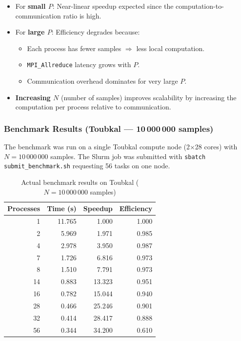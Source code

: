 \documentclass[11pt,a4paper]{article}
\begin{document}
\begin{itemize}
    \item For \textbf{small $P$}: Near-linear speedup expected since the computation-to-communication ratio is high.
    \item For \textbf{large $P$}: Efficiency degrades because:
    \begin{itemize}
        \item Each process has fewer samples $\Rightarrow$ less local computation.
        \item \texttt{MPI\_Allreduce} latency grows with $P$.
        \item Communication overhead dominates for very large $P$.
    \end{itemize}
    \item \textbf{Increasing $N$} (number of samples) improves scalability by increasing the computation per process relative to communication.
\end{itemize}

\subsubsection{Benchmark Results (Toubkal --- 10\,000\,000 samples)}

The benchmark was run on a single Toubkal compute node (2$\times$28 cores) with $N = 10\,000\,000$ samples. The Slurm job was submitted with \texttt{sbatch submit\_benchmark.sh} requesting 56 tasks on one node.

\begin{table}[H]
\centering
\caption{Actual benchmark results on Toubkal ($N = 10\,000\,000$ samples)}
\begin{tabular}{@{}rrrr@{}}
\toprule
Processes & Time (s) & Speedup & Efficiency \\
\midrule
1  & 11.765 &  1.000 & 1.000 \\
2  &  5.969 &  1.971 & 0.985 \\
4  &  2.978 &  3.950 & 0.987 \\
7  &  1.726 &  6.816 & 0.973 \\
8  &  1.510 &  7.791 & 0.973 \\
14 &  0.883 & 13.323 & 0.951 \\
16 &  0.782 & 15.044 & 0.940 \\
28 &  0.466 & 25.246 & 0.901 \\
32 &  0.414 & 28.417 & 0.888 \\
56 &  0.344 & 34.200 & 0.610 \\
\bottomrule
\end{tabular}
\end{table}
\end{document}
